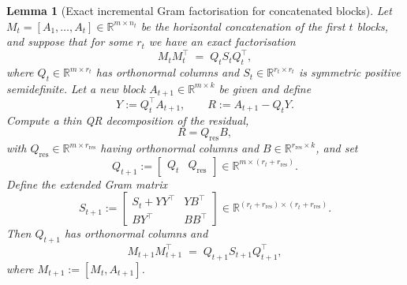 \documentclass[10pt]{article} %
\newtheorem{lemma}{Lemma}
\begin{document}
\begin{lemma}[Exact incremental Gram factorisation for concatenated blocks]
\label{lem:incremental-gram}
Let $M_t = [A_1,\dots,A_t] \in \mathbb{R}^{m\times n_t}$ be the horizontal
concatenation of the first $t$ blocks, and suppose that for some $r_t$ we
have an exact factorisation
\[
  M_t M_t^\top \;=\; Q_t S_t Q_t^\top,
\]
where $Q_t \in \mathbb{R}^{m\times r_t}$ has orthonormal columns and
$S_t \in \mathbb{R}^{r_t\times r_t}$ is symmetric positive semidefinite.
Let a new block $A_{t+1}\in\mathbb{R}^{m\times k}$ be given and define
\[
  Y := Q_t^\top A_{t+1}, \qquad
  R := A_{t+1} - Q_t Y.
\]
Compute a thin QR decomposition of the residual,
\[
  R = Q_{\mathrm{res}} B,
\]
with $Q_{\mathrm{res}}\in\mathbb{R}^{m\times r_{\mathrm{res}}}$ having
orthonormal columns and $B\in\mathbb{R}^{r_{\mathrm{res}}\times k}$, and set
\[
  Q_{t+1} :=
  \begin{bmatrix}
    Q_t & Q_{\mathrm{res}}
  \end{bmatrix}
  \in\mathbb{R}^{m\times (r_t + r_{\mathrm{res}})}.
\]
Define the extended Gram matrix
\[
  S_{t+1} :=
  \begin{bmatrix}
    S_t + Y Y^\top & Y B^\top\\[0.3em]
    B Y^\top       & B B^\top
  \end{bmatrix}
  \in\mathbb{R}^{(r_t + r_{\mathrm{res}})\times (r_t + r_{\mathrm{res}})}.
\]
Then $Q_{t+1}$ has orthonormal columns and
\[
  M_{t+1} M_{t+1}^\top
  \;=\;
  Q_{t+1} S_{t+1} Q_{t+1}^\top,
\]
where $M_{t+1} := [M_t, A_{t+1}]$.
\end{lemma}
\end{document}
